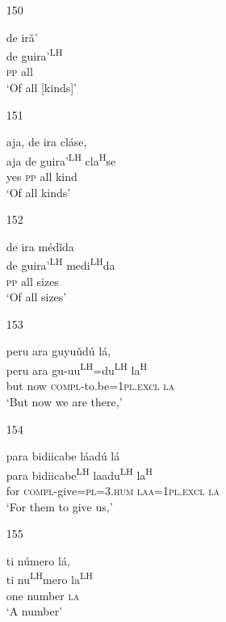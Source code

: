 \begin{itemize}
\item[150]
 
\glll   de ir\v{a}' \\
de guira'\textsuperscript{LH} \\
\textsc{pp} all \\
\glt `Of all [kinds]' 
 



\item[151]
 
\glll   aja, de ira cl\'{a}se,  \\
 aja de guira'\textsuperscript{LH} cla\textsuperscript{H}se \\
yes \textsc{pp} all kind \\
\glt `Of all kinds'
 



\item[152]
 
\glll   de ira m\'{e}d\v{i}da  \\
 de guira'\textsuperscript{LH} medi\textsuperscript{LH}da \\
\textsc{pp} all sizes \\
\glt `Of all sizes'
 



\item[153]
 
\glll   peru ara guyu\v{u}d\'{u} l\'{a},  \\
peru ara gu-uu\textsuperscript{LH}=du\textsuperscript{LH} la\textsuperscript{H}  \\
but now \textsc{compl}-to.be=\textsc{1pl.excl} \textsc{la} \\
\glt `But now we are there,'
 


\item[154]
 
\glll   para bidiicabe l\'{a}ad\'{u} l\'{a} \\
para bidiicabe\textsuperscript{LH} laadu\textsuperscript{LH} la\textsuperscript{H} \\
for \textsc{compl}-give=\textsc{pl}=\textsc{3.hum} \textsc{laa}=\textsc{1pl.excl} \textsc{la} \\
\glt `For them to give us,'
 



\item[155]
 
\glll   ti n\'{u}mero l\'{a},  \\
ti nu\textsuperscript{LH}mero la\textsuperscript{LH} \\
one number \textsc{la} \\
\glt `A number'
 



\end{itemize}

